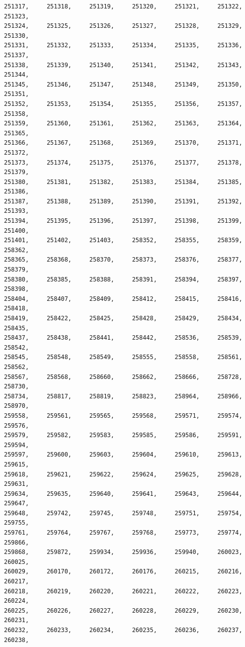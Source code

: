 \documentclass[a4paper,11pt]{report}
\begin{document}
\begin{verbatim}
251317,     251318,     251319,     251320,     251321,     251322,     251323,
251324,     251325,     251326,     251327,     251328,     251329,     251330,
251331,     251332,     251333,     251334,     251335,     251336,     251337,
251338,     251339,     251340,     251341,     251342,     251343,     251344,
251345,     251346,     251347,     251348,     251349,     251350,     251351,
251352,     251353,     251354,     251355,     251356,     251357,     251358,
251359,     251360,     251361,     251362,     251363,     251364,     251365,
251366,     251367,     251368,     251369,     251370,     251371,     251372,
251373,     251374,     251375,     251376,     251377,     251378,     251379,
251380,     251381,     251382,     251383,     251384,     251385,     251386,
251387,     251388,     251389,     251390,     251391,     251392,     251393,
251394,     251395,     251396,     251397,     251398,     251399,     251400,
251401,     251402,     251403,     258352,     258355,     258359,     258362,
258365,     258368,     258370,     258373,     258376,     258377,     258379,
258380,     258385,     258388,     258391,     258394,     258397,     258398,
258404,     258407,     258409,     258412,     258415,     258416,     258418,
258419,     258422,     258425,     258428,     258429,     258434,     258435,
258437,     258438,     258441,     258442,     258536,     258539,     258542,
258545,     258548,     258549,     258555,     258558,     258561,     258562,
258567,     258568,     258660,     258662,     258666,     258728,     258730,
258734,     258817,     258819,     258823,     258964,     258966,     258970,
259558,     259561,     259565,     259568,     259571,     259574,     259576,
259579,     259582,     259583,     259585,     259586,     259591,     259594,
259597,     259600,     259603,     259604,     259610,     259613,     259615,
259618,     259621,     259622,     259624,     259625,     259628,     259631,
259634,     259635,     259640,     259641,     259643,     259644,     259647,
259648,     259742,     259745,     259748,     259751,     259754,     259755,
259761,     259764,     259767,     259768,     259773,     259774,     259866,
259868,     259872,     259934,     259936,     259940,     260023,     260025,
260029,     260170,     260172,     260176,     260215,     260216,     260217,
260218,     260219,     260220,     260221,     260222,     260223,     260224,
260225,     260226,     260227,     260228,     260229,     260230,     260231,
260232,     260233,     260234,     260235,     260236,     260237,     260238,

\end{verbatim}
\end{document}
